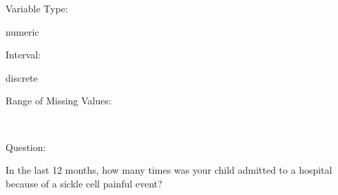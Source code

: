 \documentclass[
]{article}
\begin{document}
\begin{minipage}[t]{0.3\linewidth}

Variable Type:

\end{minipage}%
\begin{minipage}[t]{0.7\linewidth}

numeric

\end{minipage}

\begin{minipage}[t]{0.3\linewidth}

Interval:

\end{minipage}%
\begin{minipage}[t]{0.7\linewidth}

discrete

\end{minipage}

\begin{minipage}[t]{0.3\linewidth}

Range of Missing Values:

\end{minipage}%
\begin{minipage}[t]{0.7\linewidth}

~

\end{minipage}

\begin{minipage}[t]{0.3\linewidth}

Question:

\end{minipage}%
\begin{minipage}[t]{0.7\linewidth}

In the last 12 months, how many times was your child admitted to a
hospital because of a sickle cell painful event?

\end{minipage}
\end{document}
